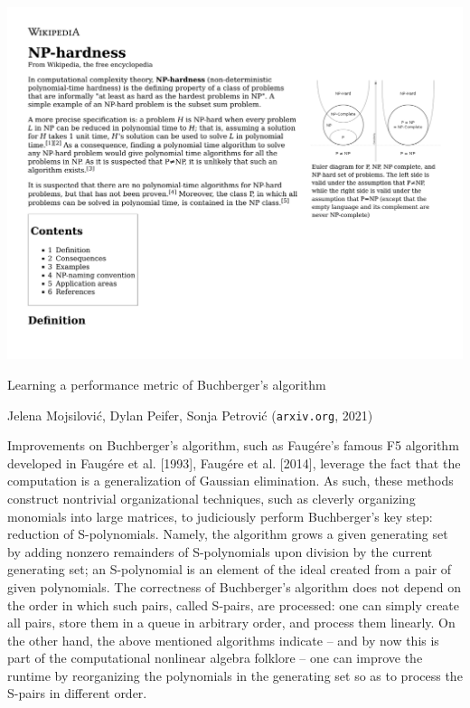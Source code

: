 \documentclass{beamer}
\begin{document}
\begin{frame}
\includegraphics[width=\textwidth]{NP-hardness - Wikipedia.pdf}
\end{frame}

\begin{frame}

\begin{exampleblock}{Learning a performance metric of Buchberger's algorithm

Jelena Mojsilovi\'c, Dylan Peifer, Sonja Petrovi\'c ({\tt arxiv.org}, 2021)
}
Improvements on Buchberger's algorithm, such as Faug\'ere's famous F5 algorithm developed
in Faug\'ere et al. [1993], Faug\'ere et al. [2014], leverage the fact that the computation is
a generalization of Gaussian elimination. As such, these methods construct nontrivial
organizational techniques, such as cleverly organizing monomials into large matrices, to judiciously
perform Buchberger's key step: reduction of S-polynomials. Namely, the algorithm grows a
given generating set by adding nonzero remainders of S-polynomials upon division by the
current generating set; an S-polynomial is an element of the ideal created from a pair of
given polynomials. The correctness of Buchberger's algorithm does not depend on the order
in which such pairs, called S-pairs, are processed: one can simply create all pairs, store them
in a queue in arbitrary order, and process them linearly. On the other hand, the above
mentioned algorithms indicate – and by now this is part of the computational nonlinear algebra
folklore – one can improve the runtime by reorganizing the polynomials in the generating set
so as to process the S-pairs in different order.
\end{exampleblock}

\end{frame}
\end{document}

